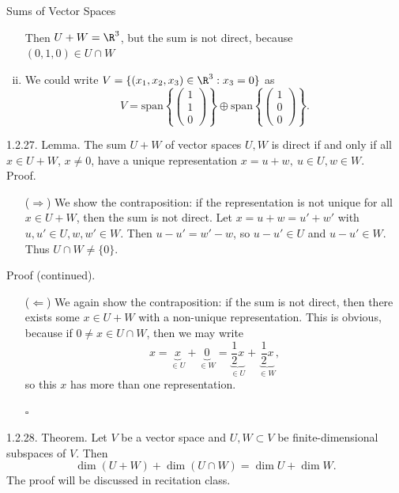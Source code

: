 \documentclass[smaller,hyperref={CJKbookmarks=true}]{beamer}
\begin{document}
\begin{frame}{Sums of Vector Spaces}
\begin{spacing}{1.1}
\begin{enumerate}[(i)]
      Then $U+W=\R^3$, but the sum is not direct, because\\ $(0,1,0)\in U\cap W$
  \item We could write $V=\{(x_1,x_2,x_3)\in\R^3:x_3=0\}$ as
      \[V=\text{span}\left\{\begin{pmatrix}
      1 \\1 \\0\end{pmatrix}\right\}\oplus\text{span}\left\{\begin{pmatrix}
      1 \\0 \\0\end{pmatrix}\right\}.\]
\end{enumerate}
\newpage
\alert{1.2.27. Lemma.} The sum $U+W$ of vector spaces $U,W$ is direct if and only if all $x\in U+W$, $x\neq0$, have a unique representation $x=u+w,~u\in U,w\in W$.\\[11pt]
\alert{Proof.}
\begin{itemize}
  \item[($\Rightarrow$)] We show the contraposition: if the representation is not unique for all $x\in U+W$, then the sum is not direct. Let $x=u+w=u'+w'$ with $u,u'\in U,w,w'\in W$. Then $u-u'=w'-w$, so $u-u'\in U$ and $u-u'\in W$. Thus $U\cap W\neq\{0\}.$
  \end{itemize}
      \newpage
\alert{Proof (continued).}\\[12pt]
  \begin{itemize}
  \item[($\Leftarrow$)] We again show the contraposition: if the sum is not direct, then there exists some $x\in U+W$ with a non-unique representation. This is obvious, because if $0\neq x\in U\cap W$, then we may write
      \[x=\underbrace{x}_{\in U}+\underbrace{0}_{\in W}=\underbrace{\frac{1}{2}x}_{\in U}+\underbrace{\frac{1}{2}x}_{\in W},\]
      so this $x$ has more than one representation.
      \begin{flushright}
        $\square$
      \end{flushright}
\end{itemize}
\newpage
\vspace*{20mm}
\alert{1.2.28. Theorem.} Let $V$ be a vector space and $U,W\subset V$ be finite-dimensional subspaces of $V$. Then
\[\dim(U+W)+\dim(U\cap W)=\dim U+\dim W.\]
\vspace*{15pt}
The proof will be discussed in recitation class.
\end{spacing}
\end{frame}
\end{document}
